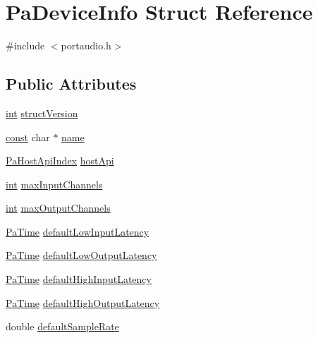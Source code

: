 \hypertarget{struct_pa_device_info}{}\section{Pa\+Device\+Info Struct Reference}
\label{struct_pa_device_info}


{\ttfamily \#include $<$portaudio.\+h$>$}

\subsection*{Public Attributes}
\begin{DoxyCompactItemize}
\item 
\hyperlink{xmltok_8h_a5a0d4a5641ce434f1d23533f2b2e6653}{int} \hyperlink{struct_pa_device_info_a2d726add4cd2af78a94c052b3a7df568}{struct\+Version}
\item 
\hyperlink{getopt1_8c_a2c212835823e3c54a8ab6d95c652660e}{const} char $\ast$ \hyperlink{struct_pa_device_info_a1bc26d68f1d89472ae67eaa49a542aea}{name}
\item 
\hyperlink{portaudio_8h_aeef6da084c57c70aa94be97411e19930}{Pa\+Host\+Api\+Index} \hyperlink{struct_pa_device_info_afe741e4d185069577f7e74b78fdef5a4}{host\+Api}
\item 
\hyperlink{xmltok_8h_a5a0d4a5641ce434f1d23533f2b2e6653}{int} \hyperlink{struct_pa_device_info_ad0baeeb2b6ceaf7fc9bb76109a7555e9}{max\+Input\+Channels}
\item 
\hyperlink{xmltok_8h_a5a0d4a5641ce434f1d23533f2b2e6653}{int} \hyperlink{struct_pa_device_info_a48f908b21e8a11fdf0a88132b18fe7b0}{max\+Output\+Channels}
\item 
\hyperlink{portaudio_8h_af17a7e6d0471a23071acf8dbd7bbe4bd}{Pa\+Time} \hyperlink{struct_pa_device_info_aad6629064b8c7cf043d237ea0a5cc534}{default\+Low\+Input\+Latency}
\item 
\hyperlink{portaudio_8h_af17a7e6d0471a23071acf8dbd7bbe4bd}{Pa\+Time} \hyperlink{struct_pa_device_info_a89e60515505eea8d668ede3a26a19ac6}{default\+Low\+Output\+Latency}
\item 
\hyperlink{portaudio_8h_af17a7e6d0471a23071acf8dbd7bbe4bd}{Pa\+Time} \hyperlink{struct_pa_device_info_a4214826038fcaf374beb9816024e6c9f}{default\+High\+Input\+Latency}
\item 
\hyperlink{portaudio_8h_af17a7e6d0471a23071acf8dbd7bbe4bd}{Pa\+Time} \hyperlink{struct_pa_device_info_a2a43dbc2b158806a937065bda037070e}{default\+High\+Output\+Latency}
\item 
double \hyperlink{struct_pa_device_info_a68f435353bfe1a4c9b632203a9afcacb}{default\+Sample\+Rate}
\end{DoxyCompactItemize}


